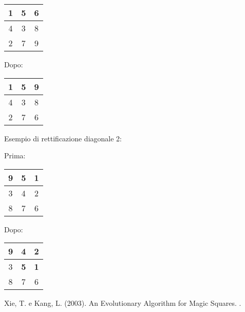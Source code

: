 \documentclass[twoside,twocolumn]{article}
\begin{document}
\begin{tabular}{|c|c|c|}
	\hline 
	\rule[-1ex]{0pt}{2.5ex} 1 & 5 & 6 \\ 
	\hline 
	\rule[-1ex]{0pt}{2.5ex} 4 & 3 & 8 \\ 
	\hline 
	\rule[-1ex]{0pt}{2.5ex} 2 & 7 & 9 \\ 
	\hline 
\end{tabular} 

Dopo: 

\begin{tabular}{|c|c|c|}
	\hline 
	\rule[-1ex]{0pt}{2.5ex} 1 & 5 & 9 \\ 
	\hline 
	\rule[-1ex]{0pt}{2.5ex} 4 & 3 & 8 \\ 
	\hline 
	\rule[-1ex]{0pt}{2.5ex} 2 & 7 & 6 \\ 
	\hline 
\end{tabular} 


Esempio di rettificazione diagonale 2:

Prima:

\begin{tabular}{|c|c|c|}
	\hline 
	\rule[-1ex]{0pt}{2.5ex} 9 & 5 & 1 \\ 
	\hline 
	\rule[-1ex]{0pt}{2.5ex} 3 & 4 & 2 \\ 
	\hline 
	\rule[-1ex]{0pt}{2.5ex} 8 & 7 & 6 \\ 
	\hline 
\end{tabular} 

Dopo:

\begin{tabular}{|c|c|c|}
	\hline 
	\rule[-1ex]{0pt}{2.5ex} 9 & \textbf{4} & \textbf{2} \\ 
	\hline 
	\rule[-1ex]{0pt}{2.5ex} 3 & \textbf{5} & \textbf{1} \\ 
	\hline 
	\rule[-1ex]{0pt}{2.5ex} 8 & 7 & 6 \\ 
	\hline 
\end{tabular} 



\begin{thebibliography}{99} %

Xie, T. e Kang, L. (2003).
\newblock An Evolutionary Algorithm for Magic Squares.
.

 
\end{thebibliography}

\end{document}
